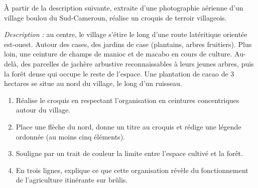\documentclass[11pt]{article}
\begin{document}
\begin{exercice}
À partir de la description suivante, extraite d'une photographie aérienne d'un village boulou du Sud-Cameroun, réalise un croquis de terroir villageois.

\emph{Description :} au centre, le village s'étire le long d'une route latéritique orientée est-ouest. Autour des cases, des jardins de case (plantains, arbres fruitiers). Plus loin, une ceinture de champs de manioc et de macabo en cours de culture. Au-delà, des parcelles de jachère arbustive reconnaissables à leurs jeunes arbres, puis la forêt dense qui occupe le reste de l'espace. Une plantation de cacao de 3 hectares se situe au nord du village, le long d'un ruisseau.

\begin{enumerate}
\item Réalise le croquis en respectant l'organisation en ceintures concentriques autour du village.
\item Place une flèche du nord, donne un titre au croquis et rédige une légende ordonnée (au moins cinq éléments).
\item Souligne par un trait de couleur la limite entre l'espace cultivé et la forêt.
\item En trois lignes, explique ce que cette organisation révèle du fonctionnement de l'agriculture itinérante sur brûlis.
\end{enumerate}
\end{exercice}
\end{document}
